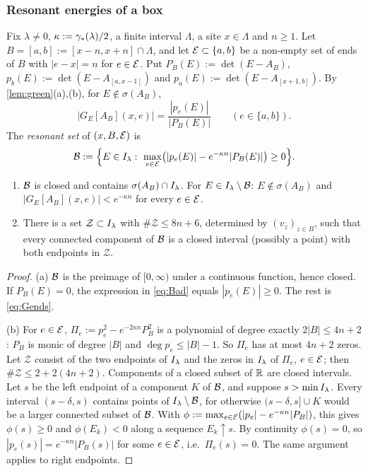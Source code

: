 \subsubsection{Resonant energies of a box}

Fix $\lambda\ne0$, $\kappa:=\gamma_*(\lambda)/2$, a finite interval $\Lambda$, a site $x\in\Lambda$ and $n\ge1$.  Let
$B=[a,b]:=[x-n,x+n]\cap\Lambda$, and let $\mathcal{E}\subset\{a,b\}$ be a non-empty set of ends of $B$ with
$|e-x|=n$ for $e\in\mathcal{E}$.  Put $P_B(E):=\det(E-A_B)$, $p_b(E):=\det(E-A_{[a,x-1]})$ and
$p_a(E):=\det(E-A_{[x+1,b]})$.  By \cref{lem:green}(a),(b), for $E\notin\sigma(A_B)$,
\begin{equation}\label{eq:Gends}
  |G_E[A_B](x,e)|=\frac{|p_e(E)|}{|P_B(E)|}\qquad(e\in\{a,b\}).
\end{equation}
The \emph{resonant set} of $(x,B,\mathcal{E})$ is
\begin{equation}\label{eq:Bad}
  \mathcal{B}:=\Bigl\{E\in I_\lambda:\ \max_{e\in\mathcal{E}}\bigl(|p_e(E)|-e^{-\kappa n}|P_B(E)|\bigr)\ge0\Bigr\}.
\end{equation}

\begin{lemma}\label{lem:badset}
\leavevmode
\begin{enumerate}[label=(\alph*)]
\item $\mathcal{B}$ is closed and contains $\sigma(A_B)\cap I_\lambda$.  For $E\in I_\lambda\setminus\mathcal{B}$: $E\notin\sigma(A_B)$ and
$|G_E[A_B](x,e)|<e^{-\kappa n}$ for every $e\in\mathcal{E}$.
\item There is a set $\mathcal Z\subset I_\lambda$ with $\#\mathcal Z\le8n+6$, determined by $(v_z)_{z\in B}$, such
that every connected component of $\mathcal{B}$ is a closed interval (possibly a point) with both endpoints in
$\mathcal Z$.
\end{enumerate}
\end{lemma}

\begin{proof}
(a) $\mathcal{B}$ is the preimage of $[0,\infty)$ under a continuous function, hence closed.  If $P_B(E)=0$, the
expression in \eqref{eq:Bad} equals $|p_e(E)|\ge0$.  The rest is \eqref{eq:Gends}.

(b) For $e\in\mathcal{E}$, $\Pi_e:=p_e^2-e^{-2\kappa n}P_B^2$ is a polynomial of degree exactly $2|B|\le4n+2$:
$P_B$ is monic of degree $|B|$ and $\deg p_e\le|B|-1$.  So $\Pi_e$ has at most $4n+2$ zeros.  Let
$\mathcal Z$ consist of the two endpoints of $I_\lambda$ and the zeros in $I_\lambda$ of $\Pi_e$, $e\in\mathcal{E}$; then
$\#\mathcal Z\le2+2(4n+2)$.  Components of a closed subset of $\mathbb{R}$ are closed intervals.  Let $s$ be the
left endpoint of a component $K$ of $\mathcal{B}$, and suppose $s>\min I_\lambda$.  Every interval $(s-\delta,s)$
contains points of $I_\lambda\setminus\mathcal{B}$, for otherwise $(s-\delta,s]\cup K$ would be a larger connected
subset of $\mathcal{B}$.  With $\phi:=\max_{e\in\mathcal{E}}(|p_e|-e^{-\kappa n}|P_B|)$, this gives $\phi(s)\ge0$ and
$\phi(E_k)<0$ along a sequence $E_k\uparrow s$.  By continuity $\phi(s)=0$, so $|p_e(s)|=e^{-\kappa n}|P_B(s)|$
for some $e\in\mathcal{E}$, i.e.\ $\Pi_e(s)=0$.  The same argument applies to right endpoints.
\end{proof}

